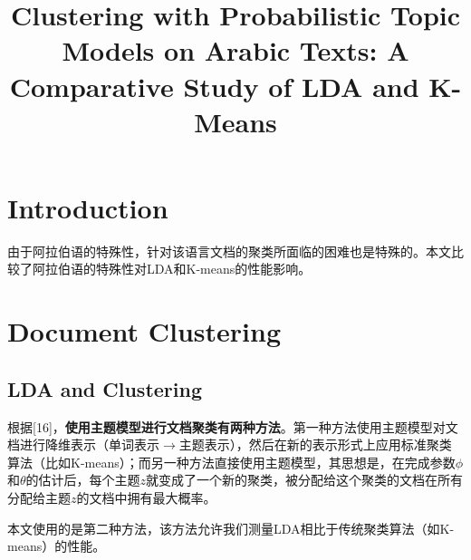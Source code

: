 \documentclass{article}
\begin{document}
\title{Clustering with Probabilistic Topic Models on Arabic Texts: A Comparative Study of LDA and K-Means}
\date{}
\maketitle

\section{Introduction}
由于阿拉伯语的特殊性，针对该语言文档的聚类所面临的困难也是特殊的。本文比较了阿拉伯语的特殊性对LDA和K-means的性能影响。

\section{Document Clustering}
\subsection*{LDA and Clustering}
根据[16]，\textbf{使用主题模型进行文档聚类有两种方法}。第一种方法使用主题模型对文档进行降维表示（单词表示$\rightarrow$主题表示），然后在新的表示形式上应用标准聚类算法（比如K-means）；而另一种方法直接使用主题模型，其思想是，在完成参数$\phi$和$\theta$的估计后，每个主题$z$就变成了一个新的聚类，被分配给这个聚类的文档在所有分配给主题$z$的文档中拥有最大概率。\par
本文使用的是第二种方法，该方法允许我们测量LDA相比于传统聚类算法（如K-means）的性能。
\end{document}
